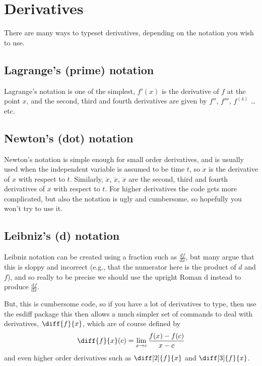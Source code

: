 \documentclass[a4paper,11pt]{article}
\begin{document}
\pagebreak




\section{Derivatives}

There are many ways to typeset derivatives, depending on the notation you wish to use.


\subsection{Lagrange's (prime) notation}

Lagrange's notation is one of the simplest, $f'(x)$ is the derivative of $f$ at the point $x$, and the second, third and fourth derivatives are given by $f''$, $f'''$, $f^{(4)}$ \dots etc.


\subsection{Newton's (dot) notation}

Newton's notation is simple enough for small order derivatives, and is usually used when the independent variable is assumed to be time $t$, so $\dot{x}$ is the derivative of $x$ with respect to $t$. Similarly, $\ddot{x}$, $\dddot{x}$, $\ddddot{x}$ are the second, third and fourth derivatives of $x$ with respect to $t$. For higher derivatives the code gets more complicated, but also the notation is ugly and cumbersome, so hopefully you won't try to use it.




\subsection{Leibniz's (d) notation}

Leibniz notation can be created using a fraction such as $\frac{d f} {dx}$, but many argue that this is sloppy and incorrect (e.g., that the numerator here is the product of $d$ and $f$), and so really to be precise we should use the upright Roman $\mathrm{d}$ instead to produce  $\frac{\mathrm{d}f} {\mathrm{d}x}$.

But, this is cumbersome code, so if you have a lot of derivatives to type, then use the esdiff package  this then allows a much simpler set of commands to deal with derivatives, $\diff{f}{x}$, which are of course defined by 
\[
\diff{f}{x}(c) = \lim_{x\to c} \frac{f(x)-f(c)}{x-c}
\] 
and even higher order derivatives such as $\diff[2]{f}{x}$ and $\diff[3]{f}{x}$.
\end{document}
